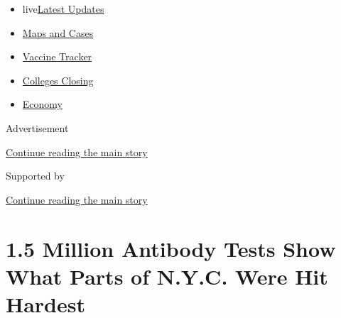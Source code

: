 \begin{itemize}
\tightlist
\item
  live\href{https://www.nytimes3xbfgragh.onion/2020/08/20/world/coronavirus-covid.html?name=styln-coronavirus-national\&region=TOP_BANNER\&variant=undefined\&block=storyline_menu_recirc\&action=click\&pgtype=Article\&impression_id=0ac2cc51-e387-11ea-9f84-5f58ac2a67a1}{Latest
  Updates}
\item
  \href{https://www.nytimes3xbfgragh.onion/interactive/2020/us/coronavirus-us-cases.html?name=styln-coronavirus-national\&region=TOP_BANNER\&variant=undefined\&block=storyline_menu_recirc\&action=click\&pgtype=Article\&impression_id=0ac2cc52-e387-11ea-9f84-5f58ac2a67a1}{Maps
  and Cases}
\item
  \href{https://www.nytimes3xbfgragh.onion/interactive/2020/science/coronavirus-vaccine-tracker.html?name=styln-coronavirus-national\&region=TOP_BANNER\&variant=undefined\&block=storyline_menu_recirc\&action=click\&pgtype=Article\&impression_id=0ac2cc53-e387-11ea-9f84-5f58ac2a67a1}{Vaccine
  Tracker}
\item
  \href{https://www.nytimes3xbfgragh.onion/2020/08/19/us/colleges-closing-covid.html?name=styln-coronavirus-national\&region=TOP_BANNER\&variant=undefined\&block=storyline_menu_recirc\&action=click\&pgtype=Article\&impression_id=0ac2cc54-e387-11ea-9f84-5f58ac2a67a1}{Colleges
  Closing}
\item
  \href{https://www.nytimes3xbfgragh.onion/live/2020/08/20/business/stock-market-today-coronavirus?name=styln-coronavirus-national\&region=TOP_BANNER\&variant=undefined\&block=storyline_menu_recirc\&action=click\&pgtype=Article\&impression_id=0ac2cc55-e387-11ea-9f84-5f58ac2a67a1}{Economy}
\end{itemize}

Advertisement

\protect\hyperlink{after-top}{Continue reading the main story}

Supported by

\protect\hyperlink{after-sponsor}{Continue reading the main story}

\hypertarget{15-million-antibody-tests-show-what-parts-of-nyc-were-hit-hardest}{%
\section{1.5 Million Antibody Tests Show What Parts of N.Y.C. Were Hit
Hardest}\label{15-million-antibody-tests-show-what-parts-of-nyc-were-hit-hardest}}

